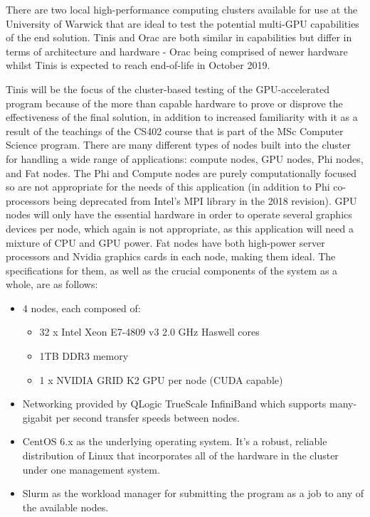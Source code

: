 \documentclass[conference]{IEEEtran}
\begin{document}
There are two local high-performance computing clusters available for use at the University of Warwick that are ideal to test the potential multi-GPU capabilities of the end solution. Tinis and Orac are both similar in capabilities but differ in terms of architecture and hardware - Orac being comprised of newer hardware whilst Tinis is expected to reach end-of-life in October 2019\cite{warwickclusters}.

Tinis will be the focus of the cluster-based testing of the GPU-accelerated program because of the more than capable hardware to prove or disprove the effectiveness of the final solution, in addition to increased familiarity with it as a result of the teachings of the CS402 course that is part of the MSc Computer Science program. There are many different types of nodes built into the cluster for handling a wide range of applications: compute nodes, GPU nodes, Phi nodes, and Fat nodes. The Phi and Compute nodes are purely computationally focused so are not appropriate for the needs of this application (in addition to Phi co-processors being deprecated from Intel's MPI library in the 2018 revision\cite{intelmpilib_whatsnew}). GPU nodes will only have the essential hardware in order to operate several graphics devices per node, which again is not appropriate, as this application will need a mixture of CPU and GPU power. Fat nodes have both high-power server processors and Nvidia graphics cards in each node, making them ideal. The specifications for them, as well as the crucial components of the system as a whole, are as follows:

\begin{itemize}
    \item 4 nodes, each composed of:
    \begin{itemize}
        \item 32 x Intel Xeon E7-4809 v3 2.0 GHz Haswell cores
        \item 1TB DDR3 memory
        \item 1 x NVIDIA GRID K2 GPU per node (CUDA capable)
    \end{itemize}
    \item Networking provided by QLogic TrueScale InfiniBand which supports many-gigabit per second transfer speeds between nodes.
    \item CentOS 6.x as the underlying operating system. It's a robust, reliable distribution of Linux that incorporates all of the hardware in the cluster under one management system.
    \item Slurm as the workload manager for submitting the program as a job to any of the available nodes.
\end{itemize}
\end{document}
